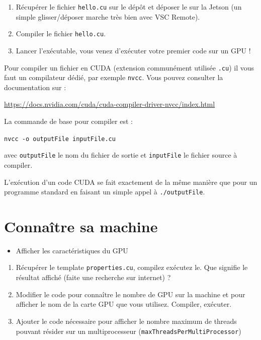 \begin{wtodo}{}
\begin{enumerate}
\item Récupérer le fichier {\tt hello.cu} sur le dépôt et déposer le sur la Jetson (un simple glisser/déposer marche très bien avec VSC Remote).
\item Compiler le fichier {\tt hello.cu}.
\item Lancer l'exécutable, vous venez d'exécuter votre premier code sur un GPU !
\end{enumerate}

\end{wtodo}

\begin{howto}{}
Pour compiler un fichier en CUDA (extension communément utilisée {\tt .cu}) il vous faut un compilateur dédié, par exemple {\tt nvcc}. Vous pouvez consulter la documentation sur :

 \url{https://docs.nvidia.com/cuda/cuda-compiler-driver-nvcc/index.html}
 
\noindent La commande de base pour compiler est :
 
 {\tt nvcc -o outputFile inputFile.cu}

avec {\tt outputFile} le nom du fichier de sortie et {\tt inputFile} le fichier source à compiler.
\end{howto} 

\begin{howto}{}
L'exécution d'un code CUDA se fait exactement de la même manière que pour un programme standard en faisant un simple appel à {\tt ./outputFile}.
\end{howto} 

  \section{Connaître sa machine}

\begin{objectif}[]{}
 \begin{itemize}
	\item Afficher les caractéristiques du GPU
\end{itemize}
\end{objectif}

\begin{wtodo}{}
\begin{enumerate}
\item Récupérer le template {\tt properties.cu}, compilez exécutez le. Que signifie le résultat affiché (faite une recherche sur internet) ?
\item Modifier le code pour connaître le nombre de GPU sur la machine et pour afficher le nom de la carte GPU que vous utilisez. Compiler, exécuter.
\item Ajouter le code nécessaire pour afficher le nombre maximum de threads pouvant résider sur un multiprocesseur ({\tt maxThreadsPerMultiProcessor})
\end{enumerate}

\end{wtodo}

